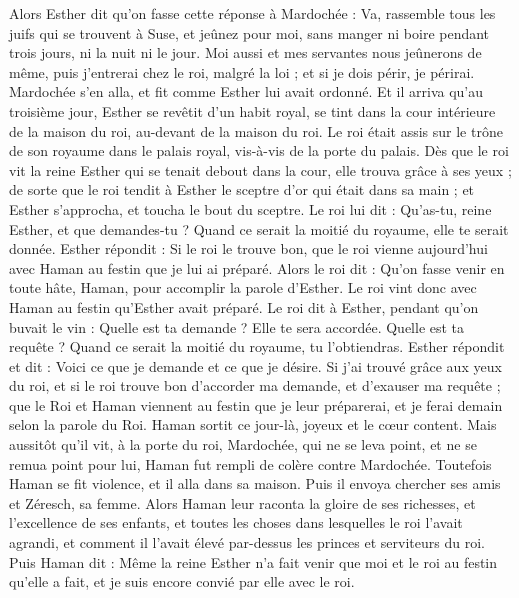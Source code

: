 \begin{multicols}{2}
Alors Esther dit qu’on fasse cette réponse à Mardochée :
Va, rassemble tous les juifs qui se trouvent à Suse, et jeûnez pour moi, sans manger ni boire pendant trois jours, ni la nuit ni le jour. Moi aussi et mes servantes nous jeûnerons de même, puis j'entrerai chez le roi, malgré la loi ; et si je dois périr, je périrai.
Mardochée s'en alla, et fit comme Esther lui avait ordonné.
\VerseOne{}Et il arriva qu’au troisième jour, Esther se revêtit d'un habit royal, se tint dans la cour intérieure de la maison du roi, au-devant de la maison du roi. Le roi était assis sur le trône de son royaume dans le palais royal, vis-à-vis de la porte du palais.
Dès que le roi vit la reine Esther qui se tenait debout dans la cour, elle trouva grâce à ses yeux ; de sorte que le roi tendit à Esther le sceptre d’or qui était dans sa main ; et Esther s’approcha, et toucha le bout du sceptre.
Le roi lui dit : Qu'as-tu, reine Esther, et que demandes-tu ? Quand ce serait la moitié du royaume, elle te serait donnée.
Esther répondit : Si le roi le trouve bon, que le roi vienne aujourd'hui avec Haman au festin que je lui ai préparé.
Alors le roi dit : Qu'on fasse venir en toute hâte, Haman, pour accomplir la parole d'Esther. Le roi vint donc avec Haman au festin qu'Esther avait préparé.
Le roi dit à Esther, pendant qu’on buvait le vin : Quelle est ta demande ? Elle te sera accordée. Quelle est ta requête ? Quand ce serait la moitié du royaume, tu l’obtiendras.
Esther répondit et dit : Voici ce que je demande et ce que je désire.
Si j'ai trouvé grâce aux yeux du roi, et si le roi trouve bon d'accorder ma demande, et d'exauser ma requête ; que le Roi et Haman viennent au festin que je leur préparerai, et je ferai demain selon la parole du Roi.
Haman sortit ce jour-là, joyeux et le cœur content. Mais aussitôt qu'il vit, à la porte du roi, Mardochée, qui ne se leva point, et ne se remua point pour lui, Haman fut rempli de colère contre Mardochée.
Toutefois Haman se fit violence, et il alla dans sa maison. Puis il envoya chercher ses amis et Zéresch, sa femme.
Alors Haman leur raconta la gloire de ses richesses, et l’excellence de ses enfants, et toutes les choses dans lesquelles le roi l’avait agrandi, et comment il l’avait élevé par-dessus les princes et serviteurs du roi.
Puis Haman dit : Même la reine Esther n'a fait venir que moi et le roi au festin qu'elle a fait, et je suis encore convié par elle avec le roi.

\end{multicols}
